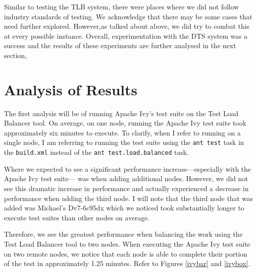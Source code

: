 \documentclass{article}
\begin{document}
{ Similar to testing the TLB system, there were places where we did not follow industry standards of testing. We acknowledge that there may be some cases that need further explored. However,as talked about above, we did try to combat this at every possible instance. Overall, experimentation with the DTS system was a success and the results of these experiments are further analysed in the next section,
\section{Analysis of Results}
\label{analysis}

The first analysis will be of running Apache Ivy's test suite on the Test Load Balancer tool.
On average, on one node, running the Apache Ivy test suite took approximately six minutes to
execute. To clarify, when I refer to running on a single node, I am referring to running the
test suite using the \texttt{ant test} task in the \texttt{build.xml} instead of the \texttt{ant test.load.balanced}
task.

Where we expected to see a significant performance increase---especially with the Apache Ivy test suite---
was when adding additional nodes. However, we did not see this dramatic increase in performance
and actually experienced a decrease in performance when adding the third node. I will note
that the third node that was added was Michael's Dv7-6c95dx which we noticed took substantially
longer to execute test suites than other nodes on average.

Therefore, we see the greatest performance when balancing the work using the Test Load Balancer tool
to two nodes. When executing the Apache Ivy test suite on two remote nodes, we notice that each
node is able to complete their portion of the test in approximately 1.25 minutes. Refer to Figures
\ref{ivybar} and \ref{ivybox}.


}
\end{document}
